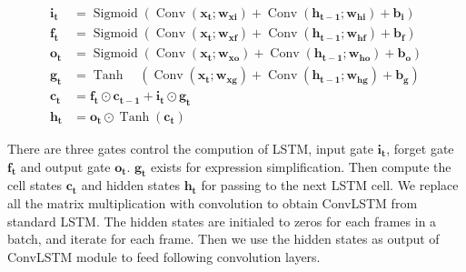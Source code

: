 \documentclass[final]{cvpr}
\begin{document}
\begin{equation}\label{convLSTM}
    \begin{aligned}
        \mathbf{i}_{\mathbf{t}} & = \operatorname{Sigmoid}\left(\operatorname{Conv}\left(\mathbf{x}_{\mathbf{t}} ; \mathbf{w}_{\mathbf{x i}}\right)+\operatorname{Conv}\left(\mathbf{h}_{\mathbf{t}-\mathbf{1}} ; \mathbf{w}_{\mathbf{h i}}\right)+\mathbf{b}_{\mathbf{i}}\right)    \\
        \mathbf{f}_{\mathbf{t}} & = \operatorname{Sigmoid}\left(\operatorname{Conv}\left(\mathbf{x}_{\mathbf{t}} ; \mathbf{w}_{\mathbf{x f}}\right)+\operatorname{Conv}\left(\mathbf{h}_{\mathbf{t}-\mathbf{1}} ; \mathbf{w}_{\mathbf{h f}}\right)+\mathbf{b}_{\mathbf{f}}\right)    \\
        \mathbf{o}_{\mathbf{t}} & = \operatorname{Sigmoid}\left(\operatorname{Conv}\left(\mathbf{x}_{\mathbf{t}} ; \mathbf{w}_{\mathbf{x o}}\right)+\operatorname{Conv}\left(\mathbf{h}_{\mathbf{t}-\mathbf{1}} ; \mathbf{w}_{\mathbf{h o}}\right)+\mathbf{b}_{\mathbf{o}}\right)    \\
        \mathbf{g}_{\mathbf{t}} & = \operatorname{Tanh} \quad\left(\operatorname{Conv}\left(\mathbf{x}_{\mathbf{t}} ; \mathbf{w}_{\mathbf{x g}}\right)+\operatorname{Conv}\left(\mathbf{h}_{\mathbf{t}-\mathbf{1}} ; \mathbf{w}_{\mathbf{h g}}\right)+\mathbf{b}_{\mathbf{g}}\right) \\
        \mathbf{c}_{\mathbf{t}} & = \mathbf{f}_{\mathbf{t}} \odot \mathbf{c}_{\mathbf{t}-\mathbf{1}}+\mathbf{i}_{\mathbf{t}} \odot \mathbf{g}_{\mathbf{t}}                                                                                                                           \\
        \mathbf{h}_{\mathbf{t}} & = \mathbf{o}_{\mathbf{t}} \odot \operatorname{Tanh}\left(\mathbf{c}_{\mathbf{t}}\right)
    \end{aligned}
\end{equation}

There are three gates control the compution of LSTM, input gate $\mathbf{i}_{\mathbf{t}}$, forget gate $\mathbf{f}_{\mathbf{t}}$ and output gate $\mathbf{o}_{\mathbf{t}}$. $\mathbf{g}_{\mathbf{t}}$ exists for expression simplification.
Then compute the cell states $\mathbf{c}_{\mathbf{t}}$ and hidden states $\mathbf{h}_{\mathbf{t}}$ for passing to the next LSTM cell.
We replace all the matrix multiplication with convolution to obtain ConvLSTM from standard LSTM.
The hidden states are initialed to zeros for each frames in a batch, and iterate for each frame.
Then we use the hidden states as output of ConvLSTM module to feed following convolution layers.
\end{document}
